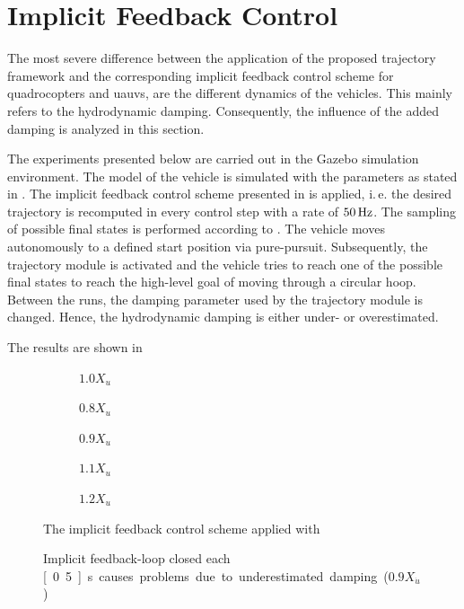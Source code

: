 \section{Implicit Feedback Control}

The most severe difference between the application of the proposed trajectory framework and the corresponding implicit feedback control scheme for quadrocopters and \acp{uauv}, are the different dynamics of the vehicles. This mainly refers to the hydrodynamic damping. Consequently, the influence of the added damping is analyzed in this section.

The experiments presented below are carried out in the Gazebo simulation environment. The model of the vehicle is simulated with the parameters as stated in . The implicit feedback control scheme presented in  is applied, i.\,e. the desired trajectory is recomputed in every control step with a rate of $\unit[50]{Hz}$. The sampling of possible final states is performed according to . The vehicle moves autonomously to a defined start position via pure-pursuit. Subsequently, the trajectory module is activated and the vehicle tries to reach one of the possible final states to reach the high-level goal of moving through a circular hoop. Between the runs, the damping parameter used by the trajectory module is changed. Hence, the hydrodynamic damping is either under- or overestimated.

The results are shown in 
\begin{figure}
	\centering
	\begin{subfigure}[t]{0.49\textwidth}
		\centering
		
		\caption{$1.0 X_u$}
	\end{subfigure}

	\begin{subfigure}[t]{0.49\textwidth}
		\centering
		
		\caption{$0.8 X_u$}
	\end{subfigure}
	\begin{subfigure}[t]{0.49\textwidth}
		\centering
		
		\caption{$0.9 X_u$}
	\end{subfigure}

	\begin{subfigure}[t]{0.49\textwidth}
		\centering
		
		\caption{$1.1 X_u$}
	\end{subfigure}
	\begin{subfigure}[t]{0.49\textwidth}
		\centering
		
		\caption{$1.2 X_u$}
	\end{subfigure}
	\caption{The implicit feedback control scheme applied with }
\end{figure}
\begin{figure}
	
	\caption{Implicit feedback-loop closed each \unit[0.5]{s} causes problems due to underestimated damping ($0.9 X_{\dot{u}}$)}
	\label{fig:implicit_problem_velocity}
\end{figure}

